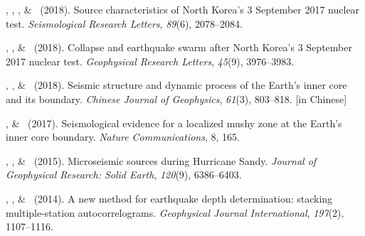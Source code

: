 \begin{etaremune}
\item
    \JYao\CF\CS, \Me\CF, \LSun, \& \LWen\ (2018).
    Source characteristics of North Korea's 3 September 2017 nuclear test.
    \emph{Seismological Research Letters}, \emph{89}(6), 2078--2084.
\item
    \Me\CF\CS, \JYao\CF, \& \LWen\ (2018).
    Collapse and earthquake swarm after North Korea's 3 September 2017 nuclear test.
    \emph{Geophysical Research Letters}, \emph{45}(9), 3976--3983.
\item
    \LWen\CS, \Me, \& \JYao\ (2018).
    Seismic structure and dynamic process of the Earth's inner core and its boundary.
    \emph{Chinese Journal of Geophysics}, \emph{61}(3), 803--818.
     [in Chinese]
\item
    \Me, \& \LWen\CS\ (2017).
    Seismological evidence for a localized mushy zone at the Earth's inner core boundary.
    \emph{Nature Communications}, 8, 165.
\item
    \XChen\CS, \Me, \& \LWen\ (2015).
    Microseismic sources during Hurricane Sandy.
    \emph{Journal of Geophysical Research: Solid Earth}, \emph{120}(9), 6386--6403.
\item \MZhang\CS, \Me, \& \LWen\ (2014).
    A new method for earthquake depth determination: stacking multiple-station autocorrelograms.
    \emph{Geophysical Journal International}, \emph{197}(2), 1107--1116.
\end{etaremune}

